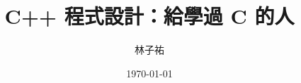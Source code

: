 \documentclass[12pt]{report}
\title{C++ 程式設計：給學過 C 的人}
\author{林子祐}
\date{\today}
\begin{document}
\maketitle
\romantableofcontents













\appendix

\end{document}
